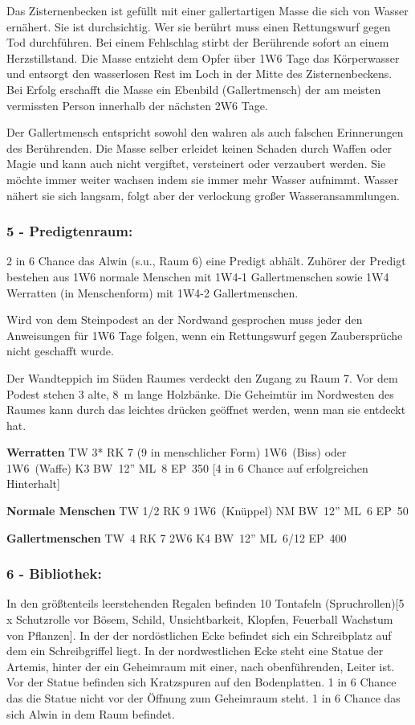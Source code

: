 
Das Zisternenbecken ist
gefüllt mit einer gallertartigen Masse die sich von Wasser ernähert. Sie
ist durchsichtig. Wer sie berührt muss einen Rettungswurf gegen Tod
durchführen. Bei einem Fehlschlag stirbt der Berührende sofort an
einem Herzstillstand. Die Masse entzieht dem Opfer über 1W6 Tage das
Körperwasser und entsorgt den wasserlosen Rest im Loch in der Mitte
des Zisternenbeckens. Bei Erfolg erschafft die Masse ein Ebenbild
(Gallertmensch) der am meisten vermissten Person innerhalb der nächsten
2W6 Tage.

Der Gallertmensch entspricht sowohl den wahren als auch falschen
Erinnerungen des Berührenden.  Die Masse selber erleidet keinen Schaden
durch Waffen oder Magie und kann auch nicht vergiftet, versteinert oder
verzaubert werden. Sie möchte immer weiter wachsen indem sie immer
mehr Wasser aufnimmt. Wasser nähert sie sich langsam, folgt aber der
verlockung großer Wasseransammlungen.

\subsubsection{5 - Predigtenraum:} 2 in 6 Chance das Alwin (s.u., Raum 6)
eine Predigt abhält. Zuhörer
der Predigt bestehen aus 1W6 normale Menschen mit 1W4-1 Gallertmenschen
sowie 1W4 Werratten (in Menschenform) mit 1W4-2 Gallertmenschen.

Wird von
dem Steinpodest an der Nordwand gesprochen muss jeder den Anweisungen
für 1W6 Tage folgen, wenn ein Rettungswurf gegen Zaubersprüche nicht
geschafft wurde.

Der Wandteppich im Süden Raumes verdeckt den Zugang
zu Raum 7. Vor dem Podest stehen 3 alte, 8~m lange Holzbänke. Die
Geheimtür im Nordwesten des Raumes kann durch das leichtes drücken
geöffnet werden, wenn man sie entdeckt hat.

\textbf{Werratten} TW 3* RK 7 (9
in menschlicher Form) 1W6~(Biss) oder 1W6~(Waffe) K3 BW~12'' ML~8 EP~350
[4 in 6 Chance auf erfolgreichen Hinterhalt] 

\textbf{Normale Menschen} TW 1/2 RK 9 1W6~(Knüppel) NM BW~12'' ML~6 EP~50

\textbf{Gallertmenschen} TW~4 RK 7 2W6 K4 BW~12'' ML~6/12 EP~400

\subsubsection{6 - Bibliothek:} In den größtenteils leerstehenden Regalen befinden
10 Tontafeln (Spruchrollen)[5 x Schutzrolle vor Bösem, Schild,
Unsichtbarkeit, Klopfen, Feuerball Wachstum von Pflanzen]. In der
der nordöstlichen Ecke befindet sich ein Schreibplatz auf dem ein
Schreibgriffel liegt. In der nordwestlichen Ecke steht eine Statue der
Artemis, hinter der ein Geheimraum mit einer, nach obenführenden, Leiter
ist. Vor der Statue befinden sich Kratzspuren auf den Bodenplatten. 1 in
6 Chance das die Statue nicht vor der Öffnung zum Geheimraum steht. 1
in 6 Chance das sich Alwin in dem Raum befindet.

